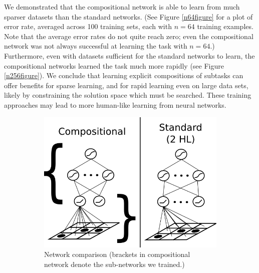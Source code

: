 \documentclass[10pt]{article}
\begin{document}
{We demonstrated that the compositional network is able to learn from much sparser datasets than the standard networks. (See Figure \ref{n64figure} for a plot of error rate, averaged across 100 training sets, each with $n = 64$ training examples. Note that the average error rates do not quite reach zero; even the compositional network was not always successful at learning the task with $n = 64$.) Furthermore, even with datasets sufficient for the standard networks to learn, the compositional networks learned the task much more rapidly (see Figure \ref{n256figure}). We conclude that learning explicit compositions of subtasks can offer benefits for sparse learning, and for rapid learning even on large data sets, likely by constraining the solution space which must be searched. These training approaches may lead to more human-like learning from neural networks.
\begin{figure}[H]
    \centering
    \begin{subfigure}[c]{0.35\textwidth}
	\centering
	\includegraphics[width=\textwidth]{figures/hierarchical_NN_abstract_figure.png}
	\caption{Network comparison (brackets in compositional network denote the sub-networks we trained.)}
	\label{networkdiagram}
    \end{subfigure}
    \begin{subfigure}[c]{0.3\textwidth}
	\centering

\end{subfigure}
\end{figure}}
\end{document}
